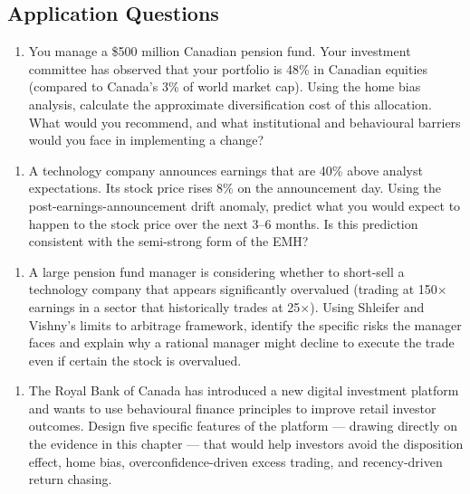 \documentclass[12pt, letterpaper]{article}
\begin{document}
\subsection{Application Questions}


\begin{enumerate}
\item You manage a \$500 million Canadian pension fund. Your investment committee has observed that your portfolio is 48\% in Canadian equities (compared to Canada's 3\% of world market cap). Using the home bias analysis, calculate the approximate diversification cost of this allocation. What would you recommend, and what institutional and behavioural barriers would you face in implementing a change?
\end{enumerate}

\begin{enumerate}
\item A technology company announces earnings that are 40\% above analyst expectations. Its stock price rises 8\% on the announcement day. Using the post-earnings-announcement drift anomaly, predict what you would expect to happen to the stock price over the next 3--6 months. Is this prediction consistent with the semi-strong form of the EMH?
\end{enumerate}

\begin{enumerate}
\item A large pension fund manager is considering whether to short-sell a technology company that appears significantly overvalued (trading at 150$\times$ earnings in a sector that historically trades at 25$\times$). Using Shleifer and Vishny's limits to arbitrage framework, identify the specific risks the manager faces and explain why a rational manager might decline to execute the trade even if certain the stock is overvalued.
\end{enumerate}

\begin{enumerate}
\item The Royal Bank of Canada has introduced a new digital investment platform and wants to use behavioural finance principles to improve retail investor outcomes. Design five specific features of the platform --- drawing directly on the evidence in this chapter --- that would help investors avoid the disposition effect, home bias, overconfidence-driven excess trading, and recency-driven return chasing.
\end{enumerate}
\end{document}
